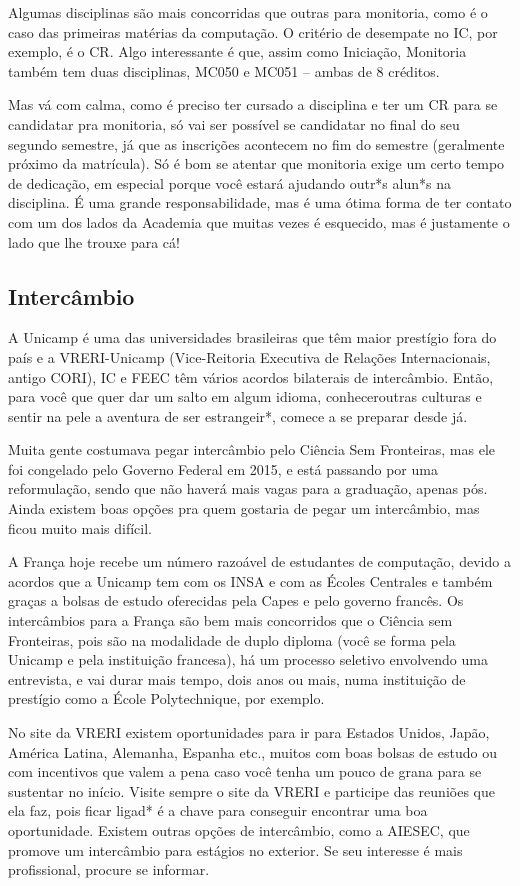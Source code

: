 Algumas disciplinas são mais concorridas que outras para monitoria, como é o
caso das primeiras matérias da computação. O critério de desempate no IC, por
exemplo, é o CR. %
Algo interessante é que, assim como Iniciação, Monitoria também tem duas
disciplinas, MC050 e MC051 -- ambas de 8 créditos.

Mas vá com calma, como é preciso ter cursado a disciplina e ter um CR para se
candidatar pra monitoria, só vai ser possível se candidatar no final do seu
segundo semestre, já que as inscrições acontecem no fim do semestre (geralmente
próximo da matrícula). Só é bom se atentar que monitoria exige um certo tempo
de dedicação, em especial porque você estará ajudando outr*s alun*s na
disciplina. É uma grande responsabilidade, mas é uma ótima forma de ter contato
com um dos lados da Academia que muitas vezes é esquecido, mas é justamente o
lado que lhe trouxe para cá!

\subsection{Intercâmbio}

A Unicamp é uma das universidades brasileiras que têm maior prestígio fora do
país e a VRERI-Unicamp (Vice-Reitoria Executiva de Relações Internacionais,
antigo CORI), IC e FEEC têm vários acordos bilaterais de intercâmbio. Então,
para você que quer dar um salto em algum idioma, conheceroutras culturas e
sentir na pele a aventura de ser estrangeir*, comece a se preparar desde já.

Muita gente costumava pegar intercâmbio pelo Ciência Sem Fronteiras, mas ele foi
congelado pelo Governo Federal em 2015, e está passando por uma reformulação,
sendo que não haverá mais vagas para a graduação, apenas pós. Ainda existem boas
opções pra quem gostaria de pegar um intercâmbio, mas ficou muito mais difícil.

A França hoje recebe um número razoável de estudantes de computação, devido a
acordos que a Unicamp tem com os INSA e com as Écoles Centrales e também graças
a bolsas de estudo oferecidas pela Capes e pelo governo francês. Os intercâmbios
para a França são bem mais concorridos que o Ciência sem Fronteiras, pois são na
modalidade de duplo diploma (você se forma pela Unicamp e pela instituição
francesa), há um processo seletivo envolvendo uma entrevista, e vai durar mais
tempo, dois anos ou mais, numa instituição de prestígio como a École
Polytechnique, por exemplo.

No site da VRERI existem oportunidades para ir para Estados Unidos, Japão,
América Latina, Alemanha, Espanha etc., muitos com boas bolsas de estudo ou com
incentivos que valem a pena caso você tenha um pouco de grana para se sustentar
no início. Visite sempre o site da VRERI e participe das reuniões que ela faz,
pois ficar ligad* é a chave para conseguir encontrar uma boa
oportunidade. Existem outras opções de intercâmbio, como a AIESEC, que promove
um intercâmbio para estágios no exterior. Se seu interesse é mais profissional,
procure se informar.


